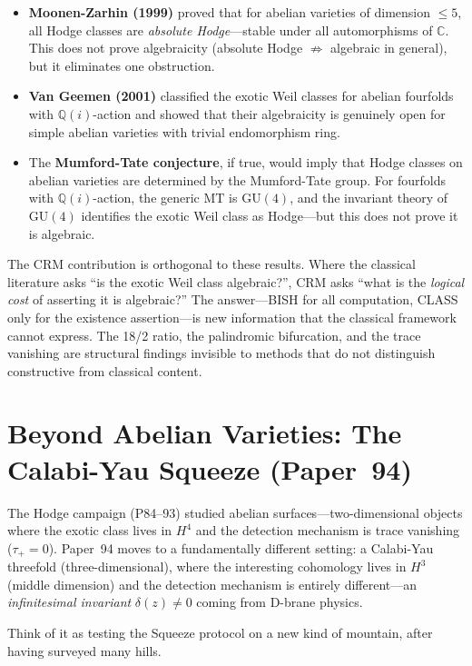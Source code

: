 \documentclass[11pt,twoside,openany]{report}
\theoremstyle{remark}
\newcommand{\BISH}{\textsf{BISH}}
\newcommand{\CLASS}{\textsf{CLASS}}
\newcommand{\paperref}[1]{\textbf{Paper~#1}}
\begin{document}
\begin{itemize}
  \item \textbf{Moonen-Zarhin (1999)} proved that for abelian varieties of dimension $\leq 5$, all Hodge classes are \emph{absolute Hodge}---stable under all automorphisms of $\mathbb{C}$. This does not prove algebraicity (absolute Hodge $\not\Rightarrow$ algebraic in general), but it eliminates one obstruction.

  \item \textbf{Van Geemen (2001)} classified the exotic Weil classes for abelian fourfolds with $\mathbb{Q}(i)$-action and showed that their algebraicity is genuinely open for simple abelian varieties with trivial endomorphism ring.

  \item The \textbf{Mumford-Tate conjecture}, if true, would imply that Hodge classes on abelian varieties are determined by the Mumford-Tate group. For fourfolds with $\mathbb{Q}(i)$-action, the generic $\mathrm{MT}$ is $\mathrm{GU}(4)$, and the invariant theory of $\mathrm{GU}(4)$ identifies the exotic Weil class as Hodge---but this does not prove it is algebraic.
\end{itemize}

The CRM contribution is orthogonal to these results. Where the classical literature asks ``is the exotic Weil class algebraic?'', CRM asks ``what is the \emph{logical cost} of asserting it is algebraic?'' The answer---\BISH{} for all computation, \CLASS{} only for the existence assertion---is new information that the classical framework cannot express. The 18/2 ratio, the palindromic bifurcation, and the trace vanishing are structural findings invisible to methods that do not distinguish constructive from classical content.


\section{Beyond Abelian Varieties: The Calabi-Yau Squeeze (\paperref{94})}

\begin{analogybox}
The Hodge campaign (P84--93) studied abelian surfaces---two-dimensional objects where the exotic class lives in $H^4$ and the detection mechanism is trace vanishing ($\tau_+ = 0$). Paper~94 moves to a fundamentally different setting: a Calabi-Yau threefold (three-dimensional), where the interesting cohomology lives in $H^3$ (middle dimension) and the detection mechanism is entirely different---an \emph{infinitesimal invariant} $\delta(z) \neq 0$ coming from D-brane physics.

Think of it as testing the Squeeze protocol on a new kind of mountain, after having surveyed many hills.
\end{analogybox}
\end{document}
